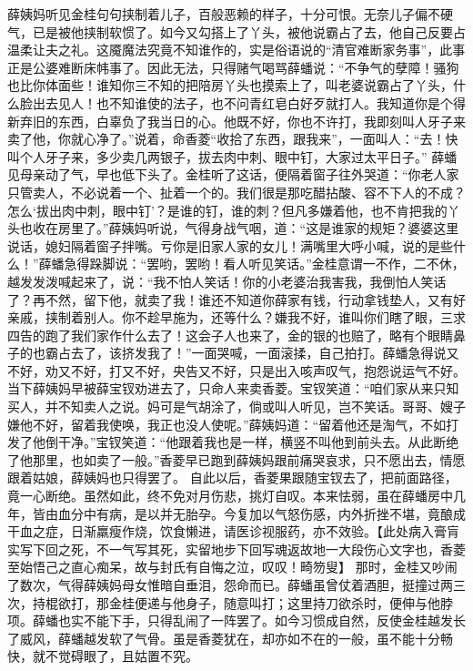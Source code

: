 \documentclass[12pt,oneside]{book}
\begin{document}
薛姨妈听见金桂句句挟制着儿子，百般恶赖的样子，十分可恨。无奈儿子偏不硬气，已是被他挟制软惯了。如今又勾搭上了丫头，被他说霸占了去，他自己反要占温柔让夫之礼。这魇魔法究竟不知谁作的，实是俗语说的“清官难断家务事”，此事正是公婆难断床帏事了。因此无法，只得赌气喝骂薛蟠说：“不争气的孽障！骚狗也比你体面些！谁知你三不知的把陪房丫头也摸索上了，叫老婆说霸占了丫头，什么脸出去见人！也不知谁使的法子，也不问青红皂白好歹就打人。我知道你是个得新弃旧的东西，白辜负了我当日的心。他既不好，你也不许打，我即刻叫人牙子来卖了他，你就心净了。”说着，命香菱“收拾了东西，跟我来”，一面叫人：“去！快叫个人牙子来，多少卖几两银子，拔去肉中刺、眼中钉，大家过太平日子。”
薛蟠见母亲动了气，早也低下头了。金桂听了这话，便隔着窗子往外哭道：“你老人家只管卖人，不必说着一个、扯着一个的。我们很是那吃醋拈酸、容不下人的不成？怎么‘拔出肉中刺，眼中钉’？是谁的钉，谁的刺？但凡多嫌着他，也不肯把我的丫头也收在房里了。”薛姨妈听说，气得身战气咽，道：“这是谁家的规矩？婆婆这里说话，媳妇隔着窗子拌嘴。亏你是旧家人家的女儿！满嘴里大呼小喊，说的是些什么！”薛蟠急得跺脚说：“罢哟，罢哟！看人听见笑话。”金桂意谓一不作，二不休，越发发泼喊起来了，说：“我不怕人笑话！你的小老婆治我害我，我倒怕人笑话了？再不然，留下他，就卖了我！谁还不知道你薛家有钱，行动拿钱垫人，又有好亲戚，挟制着别人。你不趁早施为，还等什么？嫌我不好，谁叫你们瞎了眼，三求四告的跑了我们家作什么去了！这会子人也来了，金的银的也赔了，略有个眼睛鼻子的也霸占去了，该挤发我了！”一面哭喊，一面滚揉，自己拍打。薛蟠急得说又不好，劝又不好，打又不好，央告又不好，只是出入咳声叹气，抱怨说运气不好。
当下薛姨妈早被薛宝钗劝进去了，只命人来卖香菱。宝钗笑道：“咱们家从来只知买人，并不知卖人之说。妈可是气胡涂了，倘或叫人听见，岂不笑话。哥哥、嫂子嫌他不好，留着我使唤，我正也没人使呢。”薛姨妈道：“留着他还是淘气，不如打发了他倒干净。”宝钗笑道：“他跟着我也是一样，横竖不叫他到前头去。从此断绝了他那里，也如卖了一般。”香菱早已跑到薛姨妈跟前痛哭哀求，只不愿出去，情愿跟着姑娘，薛姨妈也只得罢了。
自此以后，香菱果跟随宝钗去了，把前面路径，竟一心断绝。虽然如此，终不免对月伤悲，挑灯自叹。本来怯弱，虽在薛蟠房中几年，皆由血分中有病，是以并无胎孕。今复加以气怒伤感，内外折挫不堪，竟酿成干血之症，日渐羸瘦作烧，饮食懒进，请医诊视服药，亦不效验。【此处病入膏肓实写下回之死，不一气写其死，实留地步下回写魂返故地一大段伤心文字也，香菱至始悟己之直心痴呆，故与封氏有自悔之泣，叹叹！畸笏叟】
那时，金桂又吵闹了数次，气得薛姨妈母女惟暗自垂泪，怨命而已。薛蟠虽曾仗着酒胆，挺撞过两三次，持棍欲打，那金桂便递与他身子，随意叫打；这里持刀欲杀时，便伸与他脖项。薛蟠也实不能下手，只得乱闹了一阵罢了。如今习惯成自然，反使金桂越发长了威风，薛蟠越发软了气骨。虽是香菱犹在，却亦如不在的一般，虽不能十分畅快，就不觉碍眼了，且姑置不究。
\end{document}
